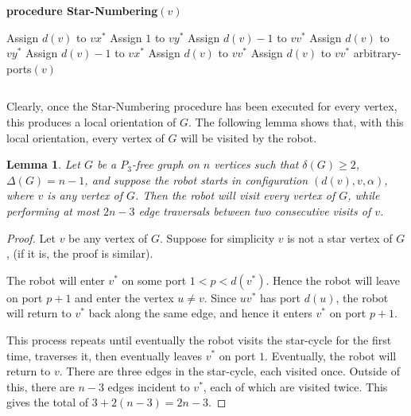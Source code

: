 \documentclass[12pt,letterpaper,oneside]{book}
\newtheorem{lemma}[theorem]{Lemma}
\begin{document}
\begin{center}\begin{tabular*}{\textwidth}{c}\hline\end{tabular*}\end{center}
\noindent \textbf{procedure Star-Numbering}$(v)$
\begin{algorithmic}[1] 
\STATE Assign $d(v)$ to $vx^*$
\STATE Assign $1$ to $vy^*$
\ENDIF
{}
\STATE Assign $d(v)-1$ to $vv^*$
\STATE Assign $d(v)$ to $vy^*$
\ENDIF
{}
\STATE Assign $d(v)-1$ to $vx^*$
\STATE Assign $d(v)$ to $vv^*$
\ENDIF
{}
\STATE Assign $d(v)$ to $vv^*$
\ENDIF
\STATE arbitrary-ports$(v)$
\end{algorithmic}
\begin{center}\begin{tabular*}{\textwidth}{c}\hline\end{tabular*}\end{center}


Clearly, once the Star-Numbering procedure has been executed for every vertex, this produces a local orientation of $G$.  The following 
lemma shows that, with this local orientation, every vertex of $G$ will be visited by the robot.   

\begin{lemma}\label{lemstar}
Let $G$ be a $P_3$-free graph on $n$ vertices such that $\delta(G)\ge 2$, $\Delta(G)=n-1$, and suppose the robot starts in configuration 
$(d(v),v,\alpha)$, 
where $v$ is any vertex of $G$.  Then the robot will visit every vertex of $G$, while performing at most $2n-3$ edge traversals between 
two consecutive visits of $v$.  
\end{lemma}
\begin{proof}

Let $v$ be any vertex of $G$.  Suppose for simplicity $v$ is not a star vertex of $G$, (if it is, the proof is similar).  

The robot will enter $v^*$ on some port $1<p<d(v^*)$.  Hence the robot will leave on port $p+1$ and enter the vertex $u\ne v$.  Since $uv^*$ has 
port $d(u)$, the robot will return to $v^*$ back along the same edge, and hence it enters $v^*$ on port $p+1$.  

This process repeats until eventually the robot visits the star-cycle for the first time, traverses it, then eventually leaves $v^*$ on 
port $1$.  Eventually, the robot will return to $v$.  There are three edges in the star-cycle, each visited once.  Outside of this, there 
are $n-3$ edges incident to $v^*$, each of which are visited twice.  This gives the total of $3+2(n-3)=2n-3$.  

\end{proof}
\end{document}
